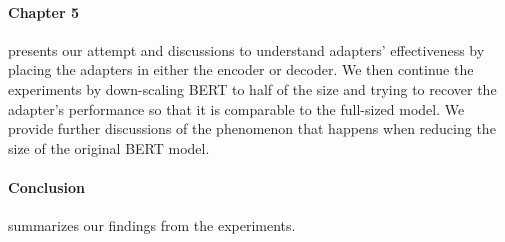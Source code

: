 \paragraph{Chapter 5} presents our attempt and discussions to understand adapters' effectiveness by placing the adapters in either the encoder or decoder. We then continue the experiments by down-scaling BERT to half of the size and trying to recover the adapter's performance so that it is comparable to the full-sized model. We provide further discussions of the phenomenon that happens when reducing the size of the original BERT model.

\paragraph{Conclusion} summarizes our findings from the experiments.